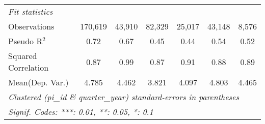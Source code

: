 \begin{tabular}{lcccccc}
   \midrule
   \emph{Fit statistics}\\
   Observations                                               & 170,619     & 43,910       & 82,329       & 25,017        & 43,148      & 8,576\\  
   Pseudo R$^2$                                               & 0.72        & 0.67         & 0.45         & 0.44          & 0.54        & 0.52\\  
   Squared Correlation                                        & 0.87        & 0.99         & 0.87         & 0.91          & 0.88        & 0.89\\  
Mean(Dep. Var.) & 4.785 & 4.462 & 3.821 & 4.097 & 4.803 & 4.465 \\
   \midrule \midrule
   \multicolumn{7}{l}{\emph{Clustered (pi\_id \& quarter\_year) standard-errors in parentheses}}\\
   \multicolumn{7}{l}{\emph{Signif. Codes: ***: 0.01, **: 0.05, *: 0.1}}\\
\end{tabular}
\par\endgroup
